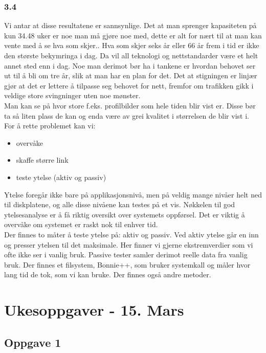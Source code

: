 \documentclass[a4paper, norsk, 12pt]{article}
\begin{document}
\subsubsection*{3.4}
Vi antar at disse resultatene er sannsynlige. Det at man sprenger kapasiteten på kun 34.48 uker er noe man må gjøre noe med, dette er alt for nært til at man kan vente med å se hva som skjer.. Hva som skjer seks år eller 66 år frem i tid er ikke den største bekymringa i dag. Da vil all teknologi og nettstandarder være et helt annet sted enn i dag. Noe man derimot bør ha i tankene er hvordan behovet ser ut til å bli om tre år, slik at man har en plan for det. Det at stigningen er linjær gjør at det er lettere å tilpasse seg behovet for nett, fremfor om trafikken gikk i veldige store svingninger uten noe mønster.\\

Man kan se på hvor store f.eks. profilbilder som hele tiden blir vist er. Disse bør ta så liten plass de kan og enda være av grei kvalitet i størrelsen de blir vist i.\\

For å rette problemet kan vi:
\begin{itemize}
\item overvåke
\item skaffe større link
\item teste ytelse (aktiv og passiv)
\end{itemize}

Ytelse foregår ikke bare på applikasjonsnivå, men på veldig mange nivåer helt ned til diskplatene, og alle disse nivåene kan testes på et vis. Nøkkelen til god ytelsesanalyse er å få riktig oversikt over systemets oppførsel. Det er viktig å overvåke om systemet er raskt nok til enhver tid.\\

Der finnes to måter å teste ytelse på: aktiv og passiv. Ved aktiv ytelse går en inn og presser ytelsen til det maksimale. Her finner vi gjerne ekstremverdier som vi ofte ikke ser i vanlig bruk. Passive tester samler derimot reelle data fra vanlig bruk. Der finnes et filsystem, Bonnie++, som bruker systemkall og måler hvor lang tid de tok, som vi kan bruke. Der finnes også andre metoder.

\section{Ukesoppgaver - 15. Mars}
\subsection{Oppgave 1}
\end{document}
